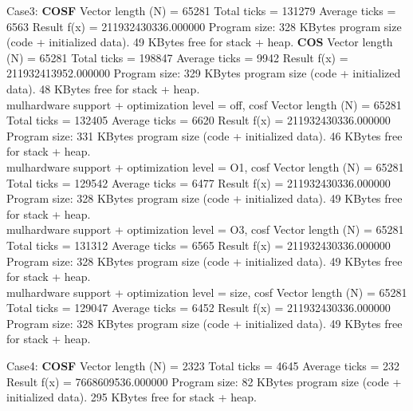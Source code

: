 Case3:
\textbf{COSF}
Vector length (N)     = 65281
Total ticks           = 131279
Average ticks         = 6563
Result f(x)           = 211932430336.000000
Program size: 328 KBytes program size (code + initialized data).
              49 KBytes free for stack + heap.
\textbf{COS}
Vector length (N)     = 65281
Total ticks           = 198847
Average ticks         = 9942
Result f(x)           = 211932413952.000000
Program size: 329 KBytes program size (code + initialized data).
              48 KBytes free for stack + heap.
\\
mulhardware support + optimization level = off, cosf
Vector length (N)     = 65281
Total ticks           = 132405
Average ticks         = 6620
Result f(x)           = 211932430336.000000
Program size: 331 KBytes program size (code + initialized data).
              46 KBytes free for stack + heap.
\\
mulhardware support + optimization level = O1, cosf
Vector length (N)     = 65281
Total ticks           = 129542
Average ticks         = 6477
Result f(x)           = 211932430336.000000
Program size: 328 KBytes program size (code + initialized data).
              49 KBytes free for stack + heap.
\\
mulhardware support + optimization level = O3, cosf
Vector length (N)     = 65281
Total ticks           = 131312
Average ticks         = 6565
Result f(x)           = 211932430336.000000
Program size: 328 KBytes program size (code + initialized data).
              49 KBytes free for stack + heap.
\\
mulhardware support + optimization level = size, cosf
Vector length (N)     = 65281
Total ticks           = 129047
Average ticks         = 6452
Result f(x)           = 211932430336.000000
Program size: 328 KBytes program size (code + initialized data).
              49 KBytes free for stack + heap.



Case4:
\textbf{COSF}
Vector length (N)     = 2323
Total ticks           = 4645
Average ticks         = 232
Result f(x)           = 7668609536.000000
Program size: 82 KBytes program size (code + initialized data).
              295 KBytes free for stack + heap.

